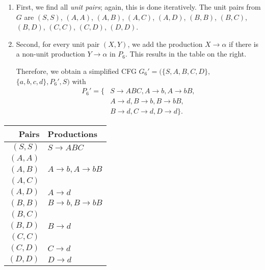 \documentclass{exercise}
\begin{document}
  \begin{solution}
      \begin{minipage}{90mm}
        \begin{enumerate}[label=\Roman*.]
          \item First, we find all \emph{unit pairs}; again, this is done iteratively.
            The unit pairs from $G$ are $(S,S)$, $(A,A)$, $(A,B)$, $(A,C)$, $(A,D)$,
            $(B,B)$,  $(B,C)$, $(B,D)$, $(C,C)$, $(C,D)$, $(D,D)$.
          \item Second, for every unit pair $(X,Y)$, we add the production
            $X\to \alpha$ if there is a non-unit production $Y\to \alpha$ in $P_6$.
            This results in the table on the right.
        
            Therefore, we obtain a simplified CFG $G_6' = (\{S,A,B,C,D\},$ $\{a,b,c,d\},P_6',S)$ with
            \begin{align*}
              P_6' = \{ & S \to ABC, A \to b, A \to bB,\\
                        & A \to d, B \to b, B \to bB,\\
                        & B \to d, C \to d, D \to d\}.
            \end{align*}
        \end{enumerate}
      \end{minipage}
      \hspace{4mm}
      \begin{minipage}{46mm}
          \begin{tabular}{r|l}
            Pairs & Productions\\
            \hline\hline
            $(S,S)$ & $S \to ABC$\\
            $(A,A)$ & \\
            $(A,B)$ & $A \to b, A \to bB$\\
            $(A,C)$ & \\
            $(A,D)$ & $A \to d$\\
            $(B,B)$ & $B \to b, B \to bB$\\
            $(B,C)$ & \\
            $(B,D)$ & $B \to d$\\
            $(C,C)$ & \\
            $(C,D)$ & $C \to d$\\ 
            $(D,D)$ & $D \to d$
          \end{tabular}
      \end{minipage}
  \end{solution}
\end{document}
